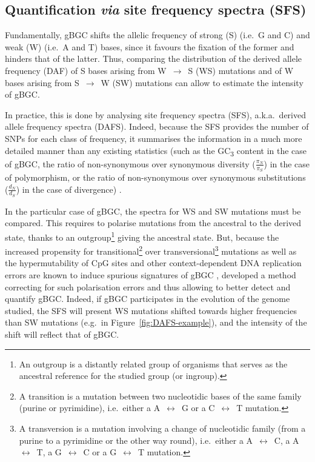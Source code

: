 \subsection{Quantification \textit{via} site frequency spectra (SFS)}

Fundamentally, gBGC shifts the allelic frequency of strong (S) (i.e.\ G and C) and weak (W) (i.e.\ A and T) bases, since it favours the fixation of the former and hinders that of the latter.
Thus, comparing the distribution of the derived allele frequency (DAF) of S bases arising from W~$\rightarrow$~S (WS) mutations and of W bases arising from S~$\rightarrow$~W (SW) mutations can allow to estimate the intensity of gBGC\@.

In practice, this is done by analysing site frequency spectra (SFS), a.k.a.\ derived allele frequency spectra (DAFS).
Indeed, because the SFS provides the number of SNPs for each class of frequency, it summarises the information in a much more detailed manner than any existing statistics (such as the GC\textsubscript{3} content in the case of gBGC, the ratio of non-synonymous over synonymous diversity ($\frac{\pi_N}{\pi_S}$) in the case of polymorphism, or the ratio of non-synonymous over synonymous substitutions ($\frac{d_N}{d_S}$) in the case of divergence) \citep{rousselle2018estimation}.

In the particular case of gBGC, the spectra for WS and SW mutations must be compared.
This requires to polarise mutations from the ancestral to the derived state, thanks to an outgroup\footnote{An outgroup is a distantly related group of organisms that serves as the ancestral reference for the studied group (or ingroup).} giving the ancestral state.
But, because the increased propensity for transitional\footnote{A transition is a mutation between two nucleotidic bases of the same family (purine or pyrimidine), i.e.\ either a A~$\leftrightarrow$~G or a C~$\leftrightarrow$~T mutation.} over transversional\footnote{A transversion is a mutation involving a change of nucleotidic family (from a purine to a pyrimidine or the other way round), i.e.\ either a A~$\leftrightarrow$~C, a A~$\leftrightarrow$~T, a G~$\leftrightarrow$~C or a G~$\leftrightarrow$~T mutation.} mutations as well as the hypermutability of CpG sites and other context-dependent DNA replication errors \citep{hwang2004bayesian} are known to induce spurious signatures of gBGC \citep{hernandez2007contextdependent}, \citet{glemin2015quantification} developed a method correcting for such polarisation errors and thus allowing to better detect and quantify gBGC\@.
Indeed, if gBGC participates in the evolution of the genome studied, the SFS will present WS mutations shifted towards higher frequencies than SW mutations (e.g.\ in Figure~\ref{fig:DAFS-example}), and the intensity of the shift will reflect that of gBGC.\\


